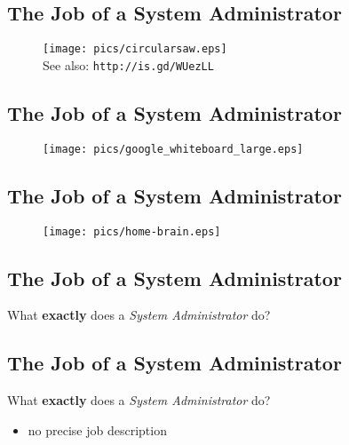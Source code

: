 \documentclass[xga]{xdvislides}
\begin{document}
\subsection{The Job of a System Administrator}
\vspace*{\fill}
\begin{figure}[hb]
	\begin{center}
		\texttt{[image: pics/circularsaw.eps]} \\
		\small See also: {\tt http://is.gd/WUezLL} \Normalsize
	\end{center}
\end{figure}
\vspace*{\fill}

\subsection{The Job of a System Administrator}
\vspace*{\fill}
\begin{figure}[hb]
	\begin{center}
		\texttt{[image: pics/google\_whiteboard\_large.eps]} \\
	\end{center}
\end{figure}
\vspace*{\fill}

\subsection{The Job of a System Administrator}
\vspace*{\fill}
\begin{figure}[hb]
	\begin{center}
		\texttt{[image: pics/home-brain.eps]} \\
	\end{center}
\end{figure}
\vspace*{\fill}

\subsection{The Job of a System Administrator}
What {\bf exactly} does a {\em System Administrator} do?

\subsection{The Job of a System Administrator}
What {\bf exactly} does a {\em System Administrator} do?
\begin{itemize}
	\item no precise job description
\end{itemize}
\end{document}
